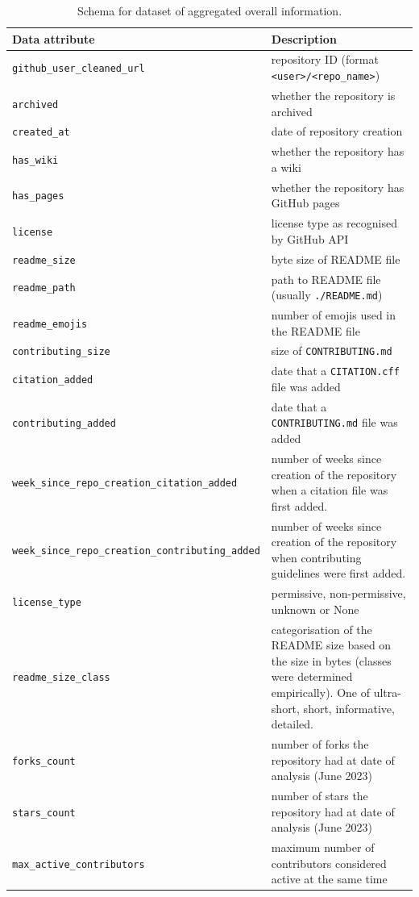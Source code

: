 \documentclass[10pt,a4paper]{scrartcl}
\begin{document}
\begin{table}
    \centering
    \begin{tabular}{|l|l|}
        \hline
        Data attribute & Description \\
        \hline
        \verb|github_user_cleaned_url| & repository ID (format \verb|<user>/<repo_name>|) \\
        \verb|archived| & whether the repository is archived \\
        \verb|created_at| & date of repository creation \\
        \verb|has_wiki| & whether the repository has a wiki \\
        \verb|has_pages| & whether the repository has GitHub pages \\
        \verb|license| & license type as recognised by GitHub API \\
        \verb|readme_size| & byte size of README file \\
        \verb|readme_path| & path to README file (usually \verb|./README.md|) \\
        \verb|readme_emojis| & number of emojis used in the README file \\
        \verb|contributing_size| & size of \verb|CONTRIBUTING.md| \\
        \verb|citation_added| & date that a \verb|CITATION.cff| file was added \\
        \verb|contributing_added| & date that a \verb|CONTRIBUTING.md| file was added \\
        \verb|week_since_repo_creation_citation_added| & number of weeks since creation of the repository when a citation file was first added.\\
        \verb|week_since_repo_creation_contributing_added| & number of weeks since creation of the repository when contributing guidelines were first added.\\
        \verb|license_type| & permissive, non-permissive, unknown or None\\
        \verb|readme_size_class| & categorisation of the README size based on the size in bytes (classes were determined empirically). One of ultra-short, short, informative, detailed.\\
        \verb|forks_count| & number of forks the repository had at date of analysis (June 2023) \\
        \verb|stars_count| & number of stars the repository had at date of analysis (June 2023) \\
        \verb|max_active_contributors| & maximum number of contributors considered active at the same time \\
        \hline
    \end{tabular}
    \caption{Schema for dataset of aggregated overall information.}
    \label{table:schema_agg_overall}
\end{table}
\end{document}
